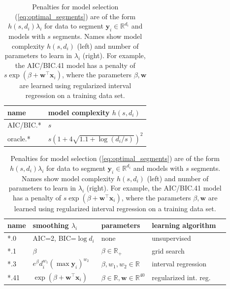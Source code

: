 \documentclass{article}
\newcommand{\RR}{\mathbb R}
\begin{document}
\begin{table}[b!]

  \begin{minipage}{0.4\textwidth}
  \begin{tabular}{ll}
    \textbf{name} & \textbf{model complexity} $h(s, d_i)$ \\
    \hline
    AIC/BIC.* & $s$\\
    oracle.* & $s\left(1 + 4\sqrt{1.1 + \log(d_i/s)}\right)^2$
  \end{tabular}
  \end{minipage}
  \begin{minipage}{0.5\textwidth}
  \begin{tabular}{lllll}
    \textbf{name} & \textbf{smoothing} $\lambda_i$ & 
    \textbf{parameters} & \textbf{learning algorithm} \\
    \hline
    *.0 & AIC=2, BIC=$\log d_i$ & none & unsupervised \\
    *.1 & 
    $\beta$ & 
    $\beta\in\RR_+$ & grid search \\
    *.3 & 
    $e^\beta d_i^{w_1} (\max \mathbf y_i)^{w_{2}}$ & 
    $\beta, w_1, w_{2}\in\RR$ & interval regression \\
    *.41 & 
    $\exp(\beta + \mathbf w^\intercal \mathbf x_i)$ & 
    $\beta\in\RR, \mathbf w\in\RR^{40}$ & 
    regularized int. reg. \\
  \end{tabular}
  \end{minipage}

  \caption{Penalties for model selection (\ref{eq:optimal_segments}) 
    are of the form
    $h(s, d_i) \lambda_i $ 
    for data to segment $\mathbf y_i\in\RR^{d_i}$ 
    and models with $s$ segments. 
    Names show model complexity
    $h(s, d_i)$ (left) and number of parameters to learn in $\lambda_i$ (right).
    For example, the AIC/BIC.41 model has a penalty of
    $s \exp(\beta + \mathbf w^\intercal \mathbf x_i)$, 
    where the parameters $\beta,\mathbf w$ 
    are learned using regularized interval regression 
    on a training data set.
  }
  \label{tab:penalties}
\end{table}
\end{document}
